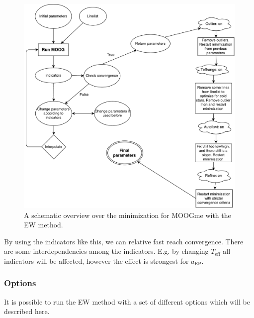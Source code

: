 \documentclass{aa}
\begin{document}
\begin{figure}[tpb]
    \centering
    \includegraphics[width=1.0\linewidth]{figures/MOOGme_minimization.pdf}
    \caption{A schematic overview over the minimization for MOOGme with the
    EW method.}
    \label{fig:MOOGme_minimization}
\end{figure}




By using the indicators like this, we can relative fast reach convergence.
There are some interdependencies among the indicators. E.g. by changing
$T_\mathrm{eff}$ all indicators will be affected, however the effect is
strongest for $a_\mathrm{EP}$.

\subsubsection{Options}
\label{subs:EWoptions}
It is possible to run the EW method with a set of different options which
will be described here.
\end{document}
